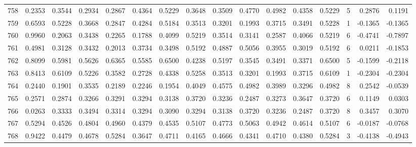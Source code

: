 \begin{tabular}{lrrrrrrrrrrrrrrr}
758 &      0.2353 &  0.3544 &  0.2934 &  0.2867 &  0.4364 &  0.5229 &  0.3648 &  0.3509 &  0.4770 &  0.4982 &   0.4358 &     0.5229 &      5 &                    0.2876 &                     0.1191 \\
759 &      0.6593 &  0.5228 &  0.3668 &  0.2847 &  0.4284 &  0.5184 &  0.3513 &  0.3201 &  0.1993 &  0.3715 &   0.3491 &     0.5228 &      1 &                   -0.1365 &                    -0.1365 \\
760 &      0.9960 &  0.2063 &  0.3438 &  0.2265 &  0.1788 &  0.4099 &  0.5219 &  0.3514 &  0.3141 &  0.2587 &   0.4066 &     0.5219 &      6 &                   -0.4741 &                    -0.7897 \\
761 &      0.4981 &  0.3128 &  0.3432 &  0.2013 &  0.3734 &  0.3498 &  0.5192 &  0.4887 &  0.5056 &  0.3955 &   0.3019 &     0.5192 &      6 &                    0.0211 &                    -0.1853 \\
762 &      0.8099 &  0.5981 &  0.5626 &  0.6365 &  0.5585 &  0.6500 &  0.4238 &  0.5197 &  0.3545 &  0.3491 &   0.3371 &     0.6500 &      5 &                   -0.1599 &                    -0.2118 \\
763 &      0.8413 &  0.6109 &  0.5226 &  0.3582 &  0.2728 &  0.4338 &  0.5258 &  0.3513 &  0.3201 &  0.1993 &   0.3715 &     0.6109 &      1 &                   -0.2304 &                    -0.2304 \\
764 &      0.2440 &  0.1901 &  0.3535 &  0.2189 &  0.2246 &  0.1954 &  0.4049 &  0.4575 &  0.4982 &  0.3989 &   0.3296 &     0.4982 &      8 &                    0.2542 &                    -0.0539 \\
765 &      0.2571 &  0.2874 &  0.3266 &  0.3291 &  0.3294 &  0.3138 &  0.3720 &  0.3236 &  0.2487 &  0.3273 &   0.3647 &     0.3720 &      6 &                    0.1149 &                     0.0303 \\
766 &      0.0263 &  0.3333 &  0.3494 &  0.3314 &  0.3294 &  0.3090 &  0.3294 &  0.3138 &  0.3720 &  0.3236 &   0.2487 &     0.3720 &      8 &                    0.3457 &                     0.3070 \\
767 &      0.5294 &  0.4526 &  0.4804 &  0.4960 &  0.4379 &  0.4535 &  0.5107 &  0.4773 &  0.5063 &  0.4942 &   0.4614 &     0.5107 &      6 &                   -0.0187 &                    -0.0768 \\
768 &      0.9422 &  0.4479 &  0.4678 &  0.5284 &  0.3647 &  0.4711 &  0.4165 &  0.4666 &  0.4341 &  0.4710 &   0.4380 &     0.5284 &      3 &                   -0.4138 &                    -0.4943 \\

\end{tabular}
